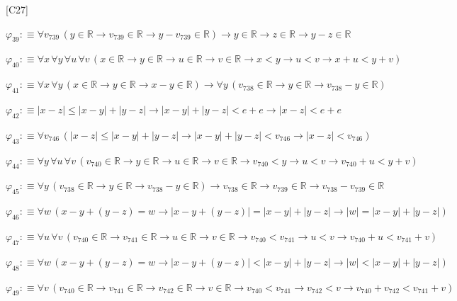 \begin{fullproof}{[C27]}
\begin{abbrevlist}
\item $\varphi_{39} :\equiv \forall v_{739}\,(y \in \mathbb{R} \to v_{739} \in \mathbb{R} \to y - v_{739} \in \mathbb{R}) \to y \in \mathbb{R} \to z \in \mathbb{R} \to y - z \in \mathbb{R}$
\item $\varphi_{40} :\equiv \forall x\,\forall y\,\forall u\,\forall v\,(x \in \mathbb{R} \to y \in \mathbb{R} \to u \in \mathbb{R} \to v \in \mathbb{R} \to x < y \to u < v \to x + u < y + v)$
\item $\varphi_{41} :\equiv \forall x\,\forall y\,(x \in \mathbb{R} \to y \in \mathbb{R} \to x - y \in \mathbb{R}) \to \forall y\,(v_{738} \in \mathbb{R} \to y \in \mathbb{R} \to v_{738} - y \in \mathbb{R})$
\item $\varphi_{42} :\equiv \lvert x - z \rvert \leq \lvert x - y \rvert + \lvert y - z \rvert \to \lvert x - y \rvert + \lvert y - z \rvert < e + e \to \lvert x - z \rvert < e + e$
\item $\varphi_{43} :\equiv \forall v_{746}\,(\lvert x - z \rvert \leq \lvert x - y \rvert + \lvert y - z \rvert \to \lvert x - y \rvert + \lvert y - z \rvert < v_{746} \to \lvert x - z \rvert < v_{746})$
\item $\varphi_{44} :\equiv \forall y\,\forall u\,\forall v\,(v_{740} \in \mathbb{R} \to y \in \mathbb{R} \to u \in \mathbb{R} \to v \in \mathbb{R} \to v_{740} < y \to u < v \to v_{740} + u < y + v)$
\item $\varphi_{45} :\equiv \forall y\,(v_{738} \in \mathbb{R} \to y \in \mathbb{R} \to v_{738} - y \in \mathbb{R}) \to v_{738} \in \mathbb{R} \to v_{739} \in \mathbb{R} \to v_{738} - v_{739} \in \mathbb{R}$
\item $\varphi_{46} :\equiv \forall w\,(x - y + (y - z) = w \to \lvert x - y + (y - z) \rvert = \lvert x - y \rvert + \lvert y - z \rvert \to \lvert w \rvert = \lvert x - y \rvert + \lvert y - z \rvert)$
\item $\varphi_{47} :\equiv \forall u\,\forall v\,(v_{740} \in \mathbb{R} \to v_{741} \in \mathbb{R} \to u \in \mathbb{R} \to v \in \mathbb{R} \to v_{740} < v_{741} \to u < v \to v_{740} + u < v_{741} + v)$
\item $\varphi_{48} :\equiv \forall w\,(x - y + (y - z) = w \to \lvert x - y + (y - z) \rvert < \lvert x - y \rvert + \lvert y - z \rvert \to \lvert w \rvert < \lvert x - y \rvert + \lvert y - z \rvert)$
\item $\varphi_{49} :\equiv \forall v\,(v_{740} \in \mathbb{R} \to v_{741} \in \mathbb{R} \to v_{742} \in \mathbb{R} \to v \in \mathbb{R} \to v_{740} < v_{741} \to v_{742} < v \to v_{740} + v_{742} < v_{741} + v)$

\end{abbrevlist}
\end{fullproof}
